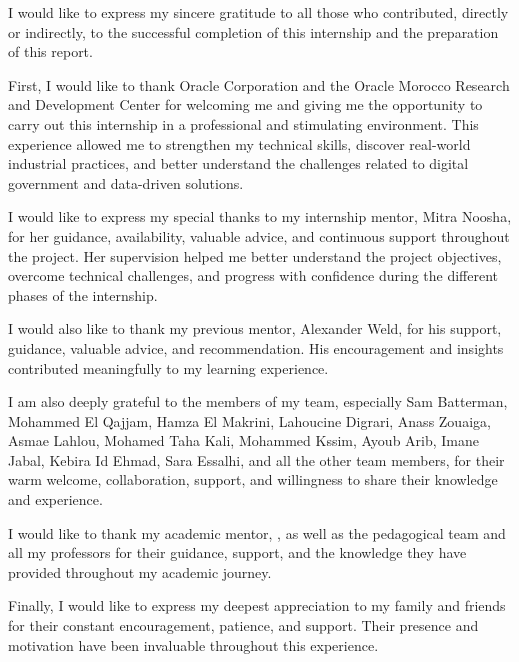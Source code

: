 
I would like to express my sincere gratitude to all those who contributed,
directly or indirectly, to the successful completion of this internship and
the preparation of this report.

First, I would like to thank Oracle Corporation and the Oracle Morocco Research
and Development Center for welcoming me and giving me the opportunity to carry
out this internship in a professional and stimulating environment. This
experience allowed me to strengthen my technical skills, discover real-world
industrial practices, and better understand the challenges related to digital
government and data-driven solutions.

I would like to express my special thanks to my internship mentor, Mitra Noosha,
for her guidance, availability, valuable advice, and continuous support
throughout the project. Her supervision helped me better understand the project
objectives, overcome technical challenges, and progress with confidence during
the different phases of the internship.

I would also like to thank my previous mentor, Alexander Weld, for his support,
guidance, valuable advice, and recommendation. His encouragement and insights
contributed meaningfully to my learning experience.

I am also deeply grateful to the members of my team, especially Sam Batterman,
Mohammed El Qajjam, Hamza El Makrini, Lahoucine Digrari, Anass Zouaiga,
Asmae Lahlou, Mohamed Taha Kali, Mohammed Kssim, Ayoub Arib, Imane Jabal,
Kebira Id Ehmad, Sara Essalhi, and all the other team members, for their warm
welcome, collaboration, support, and willingness to share their knowledge and
experience.

I would like to thank my academic mentor, \SupervisorName{}, as well as the
\UniversityName{} pedagogical team and all my professors for their guidance, support, and
the knowledge they have provided throughout my academic journey.

Finally, I would like to express my deepest appreciation to my family and
friends for their constant encouragement, patience, and support. Their presence
and motivation have been invaluable throughout this experience.

\ornrule
